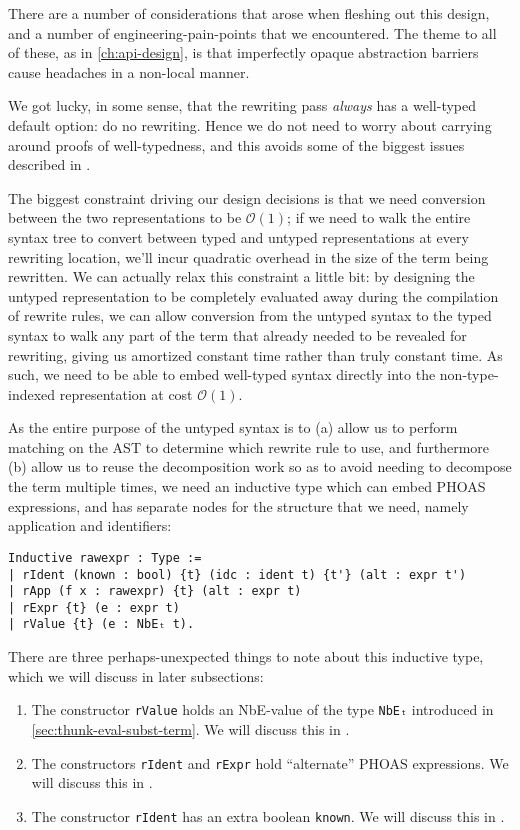 There are a number of considerations that arose when fleshing out this design, and a number of engineering-pain-points that we encountered.
The theme to all of these, as in \autoref{ch:api-design}, is that imperfectly opaque abstraction barriers cause headaches in a non-local manner.

We got lucky, in some sense, that the rewriting pass \emph{always} has a well-typed default option: do no rewriting.
Hence we do not need to worry about carrying around proofs of well-typedness, and this avoids some of the biggest issues described in .

The biggest constraint driving our design decisions is that we need conversion between the two representations to be $\mathcal{O}(1)$; if we need to walk the entire syntax tree to convert between typed and untyped representations at every rewriting location, we'll incur quadratic overhead in the size of the term being rewritten.
We can actually relax this constraint a little bit: by designing the untyped representation to be completely evaluated away during the compilation of rewrite rules, we can allow conversion from the untyped syntax to the typed syntax to walk any part of the term that already needed to be revealed for rewriting, giving us amortized constant time rather than truly constant time.
As such, we need to be able to embed well-typed syntax directly into the non-type-indexed representation at cost $\mathcal{O}(1)$.

As the entire purpose of the untyped syntax is to (a) allow us to perform matching on the AST to determine which rewrite rule to use, and furthermore (b) allow us to reuse the decomposition work so as to avoid needing to decompose the term multiple times, we need an inductive type which can embed PHOAS expressions, and has separate nodes for the structure that we need, namely application and identifiers:

\begin{verbatim}
Inductive rawexpr : Type :=
| rIdent (known : bool) {t} (idc : ident t) {t'} (alt : expr t')
| rApp (f x : rawexpr) {t} (alt : expr t)
| rExpr {t} (e : expr t)
| rValue {t} (e : NbEₜ t).
\end{verbatim}
\label{sec:rewriting-more:rawexpr-def}%
There are three perhaps-unexpected things to note about this inductive type, which we will discuss in later subsections:
\begin{enumerate}
\item
  The constructor \texttt{rValue} holds an NbE-value of the type \texttt{NbEₜ} introduced in \autoref{sec:thunk-eval-subst-term}.
  We will discuss this in .
\item
  The constructors \texttt{rIdent} and \texttt{rExpr} hold ``alternate'' PHOAS expressions.
  We will discuss this in .
\item
  The constructor \texttt{rIdent} has an extra boolean \texttt{known}.
  We will discuss this in .
\end{enumerate}


